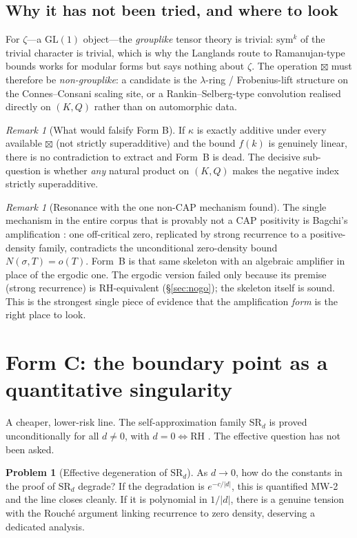 \documentclass[11pt]{amsart}
\theoremstyle{definition}
\newtheorem{problem}[theorem]{Problem}
\theoremstyle{remark}
\newtheorem{remark}[theorem]{Remark}
\begin{document}
\subsection{Why it has not been tried, and where to look}
For $\zeta$---a $\mathrm{GL}(1)$ object---the \emph{grouplike} tensor theory
is trivial: $\mathrm{sym}^k$ of the trivial character is trivial, which is
why the Langlands route to Ramanujan-type bounds works for modular forms
but says nothing about $\zeta$. The operation $\boxtimes$ must therefore be
\emph{non-grouplike}: a candidate is the $\lambda$-ring / Frobenius-lift
structure on the Connes--Consani scaling site, or a Rankin--Selberg-type
convolution realised directly on $(K,Q)$ rather than on automorphic data.

\begin{remark}[What would falsify Form B]
If $\kappa$ is exactly additive under every available $\boxtimes$ (not
strictly superadditive) and the bound $f(k)$ is genuinely linear, there is
no contradiction to extract and Form~B is dead. The decisive sub-question
is whether \emph{any} natural product on $(K,Q)$ makes the negative index
strictly superadditive.
\end{remark}

\begin{remark}[Resonance with the one non-CAP mechanism found]
The single mechanism in the entire corpus that is provably not a CAP
positivity is Bagchi's amplification \cite[]{P40}: one off-critical
zero, replicated by strong recurrence to a positive-density family,
contradicts the unconditional zero-density bound $N(\sigma,T)=o(T)$.
Form~B is that same skeleton with an algebraic amplifier in place of the
ergodic one. The ergodic version failed only because its premise (strong
recurrence) is RH-equivalent (\S\ref{sec:nogo}); the skeleton itself is
sound. This is the strongest single piece of evidence that the
amplification \emph{form} is the right place to look.
\end{remark}

\section{Form C: the boundary point as a quantitative singularity}\label{sec:formC}

A cheaper, lower-risk line. The self-approximation family $\mathrm{SR}_d$ is
proved unconditionally for all $d\neq0$, with $d=0\iff$RH
\cite[]{P40}. The effective question has not been asked.

\begin{problem}[Effective degeneration of $\mathrm{SR}_d$]\label{prob:effective}
As $d\to0$, how do the constants in the proof of $\mathrm{SR}_d$ degrade?
If the degradation is $e^{-c/|d|}$, this is quantified MW-2 and the line
closes cleanly. If it is polynomial in $1/|d|$, there is a genuine tension
with the Rouch\'e argument linking recurrence to zero density, deserving
a dedicated analysis.
\end{problem}
\end{document}
